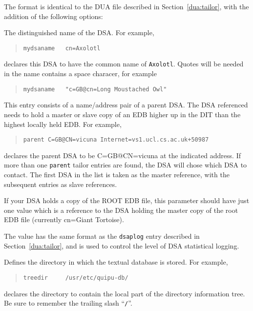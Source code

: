 The format is identical to the DUA  file
described in Section~\ref{dua:tailor}, with the addition of the
following options:
\begin{describe}
\item [\verb"mydsaname":]
The distinguished name of the DSA.
For example,
\begin{quote}\small\begin{verbatim}
mydsaname   cn=Axolotl
\end{verbatim}\end{quote}
declares this DSA to have the common name of \verb"Axolotl".
Quotes will be needed in the name contains a space characer, for example
\begin{quote}\small\begin{verbatim}
mydsaname   "c=GB@cn=Long Moustached Owl"
\end{verbatim}\end{quote}

\item [\verb"parent":]
This entry consists of a name/address pair of a parent DSA.
The DSA referenced needs to hold a master or slave copy of an EDB
higher up in the DIT than the highest locally held EDB.
For example,
\begin{quote}\small\begin{verbatim}
parent C=GB@CN=vicuna Internet=vs1.ucl.cs.ac.uk+50987
\end{verbatim}\end{quote}
declares the parent DSA to be C=GB@CN=vicuna at the
indicated address.
If more than one \verb"parent" tailor entries are found, the DSA
will chose which DSA to contact.  
The first DSA in the list is taken as the master reference, with
the subsequent entries as slave references.

If your DSA holds a copy of the ROOT EDB file, this parameter should have
just one value which is a reference to the DSA holding the master copy
of the root EDB file (currently cn=Giant Tortoise).

\item [\verb"stats":]
The value has the same format as the \verb"dsaplog" entry described in
Section~\ref{dua:tailor}, and is used to control the level of
DSA statistical logging.

\item [\verb"treedir":]
Defines the directory in which the textual database is stored.
For example,
\begin{quote}\small\begin{verbatim}
treedir     /usr/etc/quipu-db/
\end{verbatim}\end{quote}
declares the directory  to contain the local
part of the directory information tree.
Be sure to remember the trailing slash ``\verb+/+''.


\end{describe}
